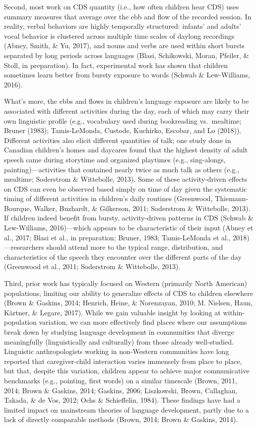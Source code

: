 \documentclass[floatsintext,man]{apa6}
\theoremstyle{definition}
\theoremstyle{definition}
\theoremstyle{definition}
\theoremstyle{remark}
\begin{document}
Second, most work on CDS quantity (i.e., how often children hear CDS)
uses summary measures that average over the ebb and flow of the recorded
session. In reality, verbal behaviors are highly temporally structured:
infants' and adults' vocal behavior is clustered across multiple time
scales of daylong recordings (Abney, Smith, \& Yu, 2017), and nouns and
verbs are used within short bursts separated by long periods across
languages (Blasi, Schikowski, Moran, Pfeiler, \& Stoll, in preparation).
In fact, experimental work has shown that children sometimes learn
better from bursty exposure to words (Schwab \& Lew-Williams, 2016).

What's more, the ebbs and flows in children's language exposure are
likely to be associated with different activities during the day, each
of which may carry their own linguistic profile (e.g., vocabulary used
during bookreading vs.~mealtime; Bruner (1983); Tamis-LeMonda, Custode,
Kuchirko, Escobar, and Lo (2018)). Different activities also elicit
different quantities of talk; one study done in Canadian children's
homes and daycares found that the highest density of adult speech came
during storytime and organized playtimes (e.g., sing-alongs,
painting)---activities that contained nearly twice as much talk as
others (e.g., mealtime; Soderstrom \& Wittebolle, 2013). Some of these
activity-driven effects on CDS can even be observed based simply on time
of day given the systematic timing of different activities in children's
daily routines (Greenwood, Thiemann-Bourque, Walker, Buzhardt, \&
Gilkerson, 2011; Soderstrom \& Wittebolle, 2013). If children indeed
benefit from bursty, activity-driven patterns in CDS (Schwab \&
Lew-Williams, 2016)---which appears to be characteristic of their input
(Abney et al., 2017; Blasi et al., in preparation; Bruner, 1983;
Tamis-LeMonda et al., 2018)---researchers should attend more to the
typical range, distribution, and characteristics of the speech they
encounter over the different parts of the day (Greenwood et al., 2011;
Soderstrom \& Wittebolle, 2013).

Third, prior work has typically focused on Western (primarily North
American) populations, limiting our ability to generalize effects of CDS
to children elsewhere (Brown \& Gaskins, 2014; Henrich, Heine, \&
Norenzayan, 2010; M. Nielsen, Haun, Kärtner, \& Legare, 2017). While we
gain valuable insight by looking at within-population variation, we can
more effectively find places where our assumptions break down by
studying language development in communities that diverge meaningfully
(linguistically and culturally) from those already well-studied.
Linguistic anthropologists working in non-Western communities have long
reported that caregiver-child interaction varies immensely from place to
place, but that, despite this variation, children appear to achieve
major communicative benchmarks (e.g., pointing, first words) on a
similar timescale (Brown, 2011, 2014; Brown \& Gaskins, 2014; Gaskins,
2006; Liszkowski, Brown, Callaghan, Takada, \& de Vos, 2012; Ochs \&
Schieffelin, 1984). These findings have had a limited impact on
mainstream theories of language development, partly due to a lack of
directly comparable methods (Brown, 2014; Brown \& Gaskins, 2014).
\end{document}

